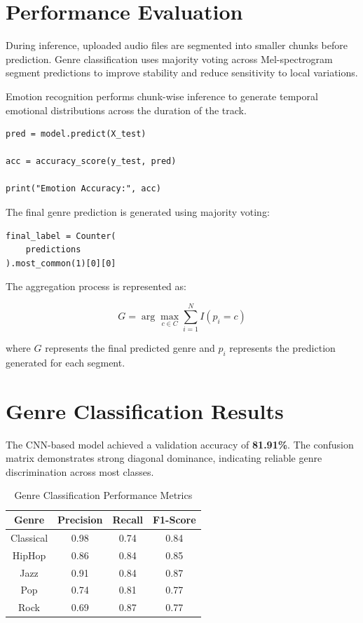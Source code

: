 \documentclass[12pt,a4paper]{report}
\begin{document}
\section{Performance Evaluation}

During inference, uploaded audio files are segmented into smaller chunks before prediction. Genre classification uses majority voting across Mel-spectrogram segment predictions to improve stability and reduce sensitivity to local variations.

Emotion recognition performs chunk-wise inference to generate temporal emotional distributions across the duration of the track.

\begin{lstlisting}
pred = model.predict(X_test)

acc = accuracy_score(y_test, pred)

print("Emotion Accuracy:", acc)
\end{lstlisting}

The final genre prediction is generated using majority voting:

\begin{lstlisting}
final_label = Counter(
    predictions
).most_common(1)[0][0]
\end{lstlisting}

The aggregation process is represented as:

\[
G = \arg\max_{c \in C}
\sum_{i=1}^{N} I(p_i = c)
\]

where \(G\) represents the final predicted genre and \(p_i\) represents the prediction generated for each segment.

\section{Genre Classification Results}

The CNN-based model achieved a validation accuracy of \textbf{81.91\%}. The confusion matrix demonstrates strong diagonal dominance, indicating reliable genre discrimination across most classes.

\begin{table}[H]
\centering
\caption{Genre Classification Performance Metrics}
\label{tab:genremetrics}

\begin{tabular}{|c|c|c|c|}
\hline
\textbf{Genre} & \textbf{Precision} & \textbf{Recall} & \textbf{F1-Score} \\
\hline
Classical & 0.98 & 0.74 & 0.84 \\
HipHop & 0.86 & 0.84 & 0.85 \\
Jazz & 0.91 & 0.84 & 0.87 \\
Pop & 0.74 & 0.81 & 0.77 \\
Rock & 0.69 & 0.87 & 0.77 \\
\hline
\end{tabular}

\end{table}
\end{document}
